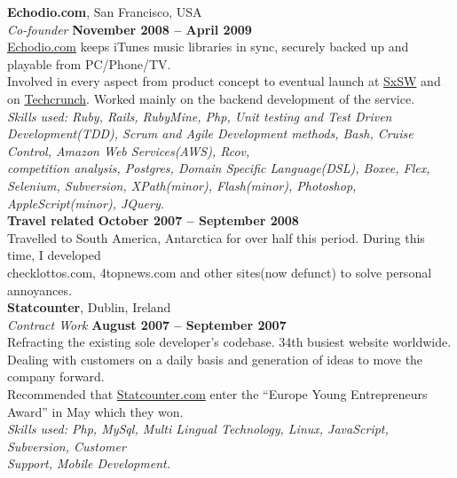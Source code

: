 \documentclass[margin,line]{resume}
\begin{document}
\begin{resume}
    \textbf{Echodio.com}, San Francisco, USA \vspace{2mm}\\\vspace{1mm}%
    \textsl{Co-founder} \hfill \textbf{November 2008 -- April 2009}\\
    \href{http://echodio.com}{Echodio.com} keeps iTunes music libraries in sync, securely backed up and playable from PC/Phone/TV. \vspace{1mm}\\%
    Involved in every aspect from product concept to eventual launch at \href{http://sxsw.com/about/history}{SxSW} and on \href{http://techcrunch.com/2009/03/17/echodio-lets-you-sync-your-itunes-to-the-cloud-300-invites/}{Techcrunch}. Worked mainly on the backend development of the service. \vspace{1mm}\vspace{1mm}\\%
    \textsl{Skills used: Ruby, Rails, RubyMine, Php, Unit testing and Test Driven Development(TDD), Scrum and Agile Development methods, Bash, Cruise Control, Amazon Web Services(AWS), Rcov, \\competition analysis, Postgres, Domain Specific Language(DSL), Boxee, Flex, Selenium, Subversion, XPath(minor), Flash(minor), Photoshop, AppleScript(minor), JQuery. } \vspace{1mm}\\%

    \textbf{Travel related} \hfill \textbf{October 2007 -- September 2008}\\\vspace{1mm}%
    Travelled to South America, Antarctica for over half this period. During this time, I developed \\checklottos.com, 4topnews.com and other sites(now defunct) to solve personal annoyances. \vspace{1mm}\\%

    \textbf{Statcounter}, Dublin, Ireland \vspace{2mm}\\\vspace{1mm}%
    \textsl{Contract Work} \hfill \textbf{August 2007 -- September 2007}\\
    Refracting the existing sole developer's codebase. 34th busiest website worldwide. \vspace{1mm}\\%
    Dealing with customers on a daily basis and generation of ideas to move the company forward. \\Recommended that \href{http://statcounter.com}{Statcounter.com} enter the ``Europe Young Entrepreneurs Award'' in May which they won.\vspace{1mm}\\%
    \textsl{Skills used: Php, MySql, Multi Lingual Technology, Linux, JavaScript, Subversion, Customer \\ Support, Mobile Development.}\vspace{1mm}\\%



\end{resume}
\end{document}
